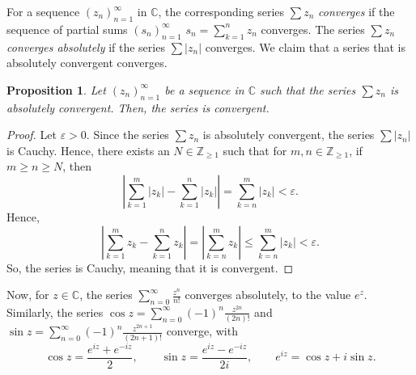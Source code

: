 \documentclass[a4paper, openany]{memoir}
\theoremstyle{definition}
\theoremstyle{plain}
\newtheorem{proposition}[definition]{Proposition}
\begin{document}
    For a sequence $(z_n)_{n=1}^\infty$ in $\mathbb{C}$, the corresponding series $\sum z_n$ \emph{converges} if the sequence of partial sums $(s_n)_{n=1}^\infty$ $s_n = \sum_{k=1}^n z_n$ converges. The series $\sum z_n$ \emph{converges absolutely} if the series $\sum |z_n|$ converges. We claim that a series that is absolutely convergent converges.
    \begin{proposition}
        Let $(z_n)_{n=1}^\infty$ be a sequence in $\mathbb{C}$ such that the series $\sum z_n$ is absolutely convergent. Then, the series is convergent.
    \end{proposition}
    \begin{proof}
        Let $\varepsilon > 0$. Since the series $\sum z_n$ is absolutely convergent, the series $\sum |z_n|$ is Cauchy. Hence, there exists an $N \in \mathbb{Z}_{\geq 1}$ such that for $m, n \in \mathbb{Z}_{\geq 1}$, if $m \geq n \geq N$, then
        \[\left|\sum_{k=1}^m |z_k| - \sum_{k=1}^n |z_k|\right| = \sum_{k=n}^m |z_k|  < \varepsilon.\]
        Hence,
        \[\left|\sum_{k=1}^m z_k - \sum_{k=1}^n z_k\right| = \left|\sum_{k=n}^m z_k\right| \leq \sum_{k=n}^m |z_k| < \varepsilon.\]
        So, the series is Cauchy, meaning that it is convergent.
    \end{proof}
    
    Now, for $z \in \mathbb{C}$, the series $\sum_{n=0}^\infty \frac{z^n}{n!}$ converges absolutely, to the value $e^z$. Similarly, the series $\cos z = \sum_{n=0}^\infty (-1)^n \frac{z^{2n}}{(2n)!}$ and $\sin z = \sum_{n=0}^\infty (-1)^n \frac{z^{2n+1}}{(2n+1)!}$ converge, with
    \[\cos z = \frac{e^{iz} + e^{-iz}}{2}, \qquad \sin z = \frac{e^{iz} - e^{-iz}}{2i}, \qquad e^{iz} = \cos z + i \sin z.\]

\end{document}
